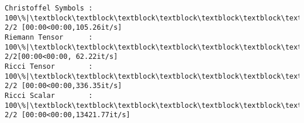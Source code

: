 \documentclass[11pt]{article}
\newcommand{\prompt}[4]{
        {\ttfamily\llap{{\color{#2}[#3]:\hspace{3pt}#4}}\vspace{-\baselineskip}}
    }
\begin{document}
    \begin{Verbatim}[commandchars=\\\{\}]
Christoffel Symbols : 100\%|\textblock\textblock\textblock\textblock\textblock\textblock\textblock\textblock\textblock\textblock\textblock\textblock\textblock\textblock\textblock\textblock\textblock\textblock\textblock\textblock\textblock\textblock\textblock\textblock\textblock\textblock\textblock\textblock\textblock\textblock\textblock\textblock\textblock\textblock| 2/2 [00:00<00:00,105.26it/s]
Riemann Tensor      : 100\%|\textblock\textblock\textblock\textblock\textblock\textblock\textblock\textblock\textblock\textblock\textblock\textblock\textblock\textblock\textblock\textblock\textblock\textblock\textblock\textblock\textblock\textblock\textblock\textblock\textblock\textblock\textblock\textblock\textblock\textblock\textblock\textblock\textblock\textblock\textblock| 2/2[00:00<00:00, 62.22it/s]
Ricci Tensor        : 100\%|\textblock\textblock\textblock\textblock\textblock\textblock\textblock\textblock\textblock\textblock\textblock\textblock\textblock\textblock\textblock\textblock\textblock\textblock\textblock\textblock\textblock\textblock\textblock\textblock\textblock\textblock\textblock\textblock\textblock\textblock\textblock\textblock\textblock\textblock| 2/2 [00:00<00:00,336.35it/s]
Ricci Scalar        : 100\%|\textblock\textblock\textblock\textblock\textblock\textblock\textblock\textblock\textblock\textblock\textblock\textblock\textblock\textblock\textblock\textblock\textblock\textblock\textblock\textblock\textblock\textblock\textblock\textblock\textblock\textblock\textblock\textblock\textblock\textblock\textblock\textblock| 2/2 [00:00<00:00,13421.77it/s]
    \end{Verbatim}
 
            
\prompt{Out}{outcolor}{9}{}
    
\end{document}

